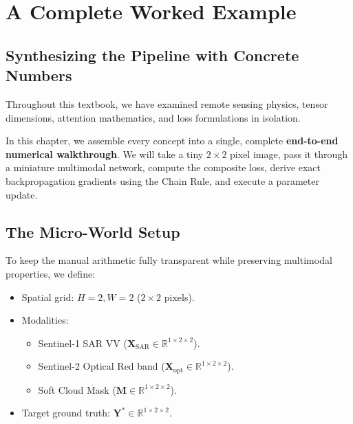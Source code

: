 \chapter{A Complete Worked Example}
\label{chap:ch22}

\section{Synthesizing the Pipeline with Concrete Numbers}
Throughout this textbook, we have examined remote sensing physics, tensor dimensions, attention mathematics, and loss formulations in isolation.

In this chapter, we assemble every concept into a single, complete \textbf{end-to-end numerical walkthrough}. We will take a tiny $2 \times 2$ pixel image, pass it through a miniature multimodal network, compute the composite loss, derive exact backpropagation gradients using the Chain Rule, and execute a parameter update.

\section{The Micro-World Setup}
To keep the manual arithmetic fully transparent while preserving multimodal properties, we define:
\begin{itemize}
    \item Spatial grid: $H = 2, W = 2$ ($2 \times 2$ pixels).
    \item Modalities:
    \begin{itemize}
        \item Sentinel-1 SAR VV ($\mathbf{X}_{\text{SAR}} \in \mathbb{R}^{1 \times 2 \times 2}$).
        \item Sentinel-2 Optical Red band ($\mathbf{X}_{\text{opt}} \in \mathbb{R}^{1 \times 2 \times 2}$).
        \item Soft Cloud Mask ($\mathbf{M} \in \mathbb{R}^{1 \times 2 \times 2}$).
    \end{itemize}
    \item Target ground truth: $\mathbf{Y}^* \in \mathbb{R}^{1 \times 2 \times 2}$.
\end{itemize}

